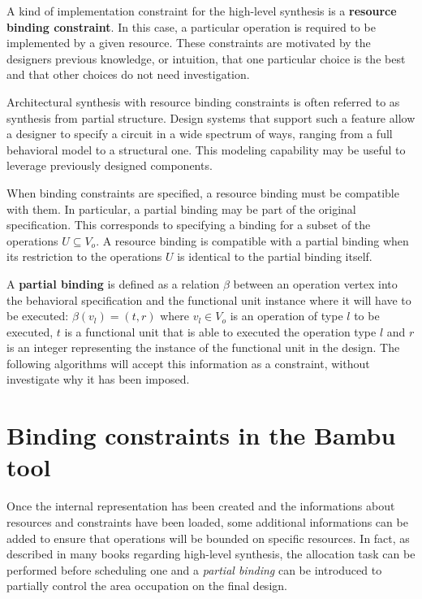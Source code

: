 A kind of implementation constraint for the high-\/level synthesis is a {\bfseries resource binding constraint}. In this case, a particular operation is required to be implemented by a given resource. These constraints are motivated by the designer\textquotesingle{}s previous knowledge, or intuition, that one particular choice is the best and that other choices do not need investigation.

Architectural synthesis with resource binding constraints is often referred to as synthesis from partial structure. Design systems that support such a feature allow a designer to specify a circuit in a wide spectrum of ways, ranging from a full behavioral model to a structural one. This modeling capability may be useful to leverage previously designed components.

When binding constraints are specified, a resource binding must be compatible with them. In particular, a partial binding may be part of the original specification. This corresponds to specifying a binding for a subset of the operations $U\subseteq V_o$. A resource binding is compatible with a partial binding when its restriction to the operations $U$ is identical to the partial binding itself.

A {\bfseries partial binding} is defined as a relation $\beta$ between an operation vertex into the behavioral specification and the functional unit instance where it will have to be executed\+: $ \beta(v_l) = (t,r) $ where $v_l\in V_o$ is an operation of type $l$ to be executed, $t$ is a functional unit that is able to executed the operation type $l$ and $r$ is an integer representing the instance of the functional unit in the design. The following algorithms will accept this information as a constraint, without investigate why it has been imposed.\hypertarget{src_HLS_binding_constraints_page_src_HLS_binding_constraints_parsing}{}\section{Binding constraints in the Bambu tool}\label{src_HLS_binding_constraints_page_src_HLS_binding_constraints_parsing}
Once the internal representation has been created and the informations about resources and constraints have been loaded, some additional informations can be added to ensure that operations will be bounded on specific resources. In fact, as described in many books regarding high-\/level synthesis, the allocation task can be performed before scheduling one and a {\itshape partial binding} can be introduced to partially control the area occupation on the final design.

